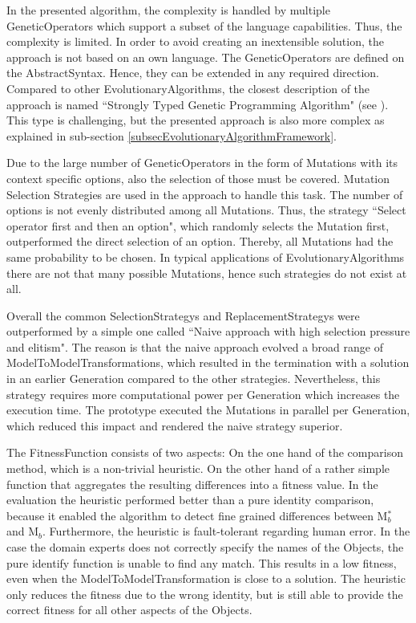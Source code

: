 In the presented algorithm, the complexity is handled by multiple \glspl{GeneticOperator} which support a subset of the language capabilities. Thus, the complexity is limited. In order to avoid creating an inextensible solution, the approach is not based on an own language. The \glspl{GeneticOperator} are defined on the \gls{AbstractSyntax}. Hence, they can be extended in any required direction. Compared to other \glspl{EvolutionaryAlgorithm}, the closest description of the approach is named ``Strongly Typed Genetic Programming Algorithm" (see \cite{Montana2002}). This type is challenging, but the presented approach is also more complex as explained in sub-section \ref{subsecEvolutionaryAlgorithmFramework}.

Due to the large number of \glspl{GeneticOperator} in the form of \glspl{Mutation} with its context specific options, also the selection of those must be covered. Mutation Selection Strategies are used in the approach to handle this task. The number of options is not evenly distributed among all \glspl{Mutation}. Thus, the strategy ``Select operator first and then an option", which randomly selects the \gls{Mutation} first, outperformed the direct selection of an option. Thereby, all \glspl{Mutation} had the same probability to be chosen. In typical applications of \glspl{EvolutionaryAlgorithm} there are not that many possible \glspl{Mutation}, hence such strategies do not exist at all.

Overall the common \glspl{SelectionStrategy} and \glspl{ReplacementStrategy} were outperformed by a simple one called ``Naive approach with high selection pressure and elitism". The reason is that the naive approach evolved a broad range of \glspl{ModelToModelTransformation}, which resulted in the termination with a solution in an earlier \gls{Generation} compared to the other strategies. Nevertheless, this strategy requires more computational power per \gls{Generation} which increases the execution time. The prototype executed the \glspl{Mutation} in parallel per \gls{Generation}, which reduced this impact and rendered the naive strategy superior.

The \gls{FitnessFunction} consists of two aspects: On the one hand of the comparison method, which is a non-trivial heuristic. On the other hand of a rather simple function that aggregates the resulting differences into a fitness value. In the evaluation the heuristic performed better than a pure identity comparison, because it enabled the algorithm to detect fine grained differences between M$_b^*$ and M$_b$. Furthermore, the heuristic is fault-tolerant regarding human error. In the case the domain experts does not correctly specify the names of the \glspl{Object}, the pure identify function is unable to find any match. This results in a low fitness, even when the \gls{ModelToModelTransformation} is close to a solution. The heuristic only reduces the fitness due to the wrong identity, but is still able to provide the correct fitness for all other aspects of the \glspl{Object}.

